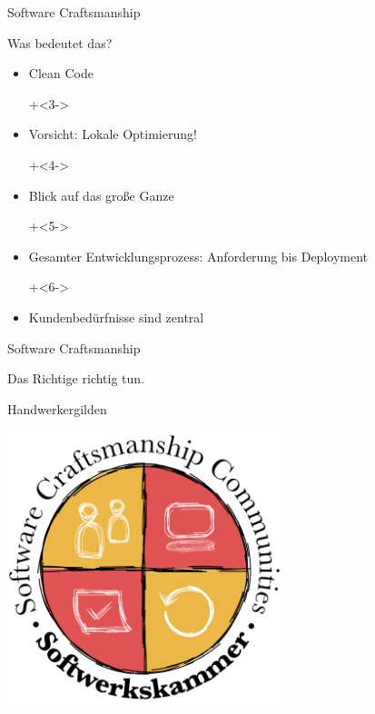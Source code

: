 \begin{frame}{Software Craftsmanship}

\Large{Was bedeutet das?}


\begin{itemize}
\onslide+<2->
	\item Clean Code
	
\onslide+<3->
	\item Vorsicht: Lokale Optimierung!
	
\onslide+<4->
	\item Blick auf das große Ganze
	
\onslide+<5->
	\item Gesamter Entwicklungsprozess: Anforderung bis Deployment
	
\onslide+<6->
	\item Kundenbedürfnisse sind zentral
	
\end{itemize}


\end{frame}


\begin{frame}{Software Craftsmanship}

\begin{center}
\Large
\glqq{}Das Richtige richtig tun.\grqq{}
\end{center}

\end{frame}

\begin{frame}{Handwerkergilden}

\begin{center}
\includegraphics[width=8cm]{bilder/Softwerkskammer_WappenMitText.png}
\end{center}

\end{frame}

